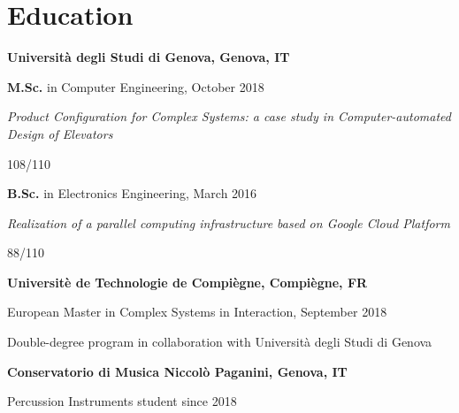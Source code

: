 \section{\sc Education}
{\bf Universit\`a degli Studi di Genova, Genova, IT}
\begin{list1}
\item[] \textbf{M.Sc.} in Computer Engineering, October 2018
\item[] \textit{Product Configuration for Complex Systems: a case study
	in Computer-automated Design of Elevators}
\item[] 108/110
\end{list1}
\begin{list1}
	\item[] \textbf{B.Sc.} in Electronics Engineering, March 2016
	\item[] \textit{Realization of a parallel computing infrastructure 
		based on Google Cloud Platform}
	\item[] 88/110
\end{list1}

{\bf Universit\`e de Technologie de Compi\`egne, Compi\`egne, FR}
\begin{list1}
	\item[] European Master in Complex Systems in Interaction, September 2018
	\item[] Double-degree program in collaboration with Universit\`a 
	degli Studi di Genova
\end{list1}

{\bf Conservatorio di Musica Niccol\`o Paganini, Genova, IT}
\begin{list1}
	\item[] Percussion Instruments student since 2018
\end{list1}